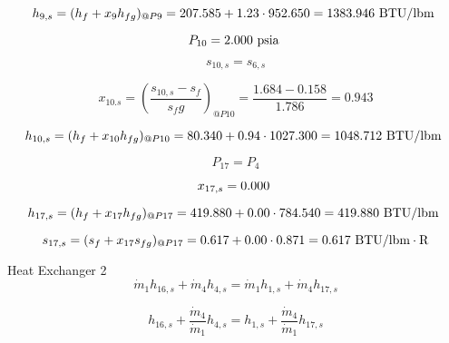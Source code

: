 \documentclass{article}
\begin{document}
\begin{equation}
  h_{ 9,s} = (h_{f} + x_{ 9}h_{fg})_{@P 9} =  207.585 + 1.23\cdot 952.650 = 1383.946
\textnormal{ BTU/lbm                   }
\end{equation}

\begin{equation}
P_{10} =    2.000\textnormal{ psia                      }
\end{equation}

\begin{equation}
s_{10,s} = s_{ 6,s}
\end{equation}

\begin{equation}
x_{10.s} = (\frac{s_{10,s} - s_{f}}{s_fg})_{@P10} = \frac{   1.684 -    0.158}{   1.786} =    0.943
\end{equation}

\begin{equation}
  h_{10,s} = (h_{f} + x_{10}h_{fg})_{@P10} =   80.340 + 0.94\cdot1027.300 = 1048.712
\textnormal{ BTU/lbm                   }
\end{equation}

\begin{equation}
P_{17} = P_{ 4}
\end{equation}

\begin{equation}
  x_{17,s} =    0.000\textnormal{                           }
\end{equation}

\begin{equation}
  h_{17,s} = (h_{f} + x_{17}h_{fg})_{@P17} =  419.880 + 0.00\cdot 784.540 =  419.880
\textnormal{ BTU/lbm                   }
\end{equation}

\begin{equation}
  s_{17,s} = (s_{f} + x_{17}s_{fg})_{@P17} =    0.617 + 0.00\cdot   0.871 =    0.617
\textnormal{ BTU/lbm}\cdot\textnormal{R}
\end{equation}


Heat Exchanger 2
\begin{equation}
\dot{m}_{ 1}h_{16,s} + \dot{m}_{ 4}h_{ 4,s} = \dot{m}_{ 1}h_{ 1,s} + \dot{m}_{ 4}h_{17,s}
\end{equation}

\begin{equation}
h_{16,s} + \frac{\dot{m}_{ 4}}{\dot{m}_{ 1}}h_{ 4,s} = h_{ 1,s} + \frac{\dot{m}_{ 4}}{\dot{m}_{ 1}}h_{17,s}
\end{equation}
\end{document}
